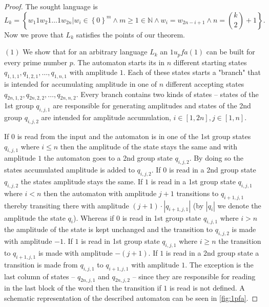 \documentclass{llncs}
\begin{document}
\begin{proof} The sought language is
\[
L_k = \left\{ w_1 1 w_2 1 \ldots 1 w_{2n} |
		w_i \in \left\{ 0 \right\}^m \wedge
		m \geq 1 \in \mathbb{N} \wedge
		w_i = w_{2n-i+1} \wedge
		n={k\choose 2}+1 \right\}.
\]
Now we prove that $L_k$ satisfies the points of our theorem.

$(1)$ We show that for an arbitrary language $L_k$ an $1u_pfa(1)$ can be built for every prime number $p$. The automaton starts its in $n$ different starting states $q_{1,1,1},q_{1,2,1},\ldots,q_{1,n,1}$ with amplitude $1$. Each of these states starts a "branch" that is intended for accumulating amplitude in one of $n$ different accepting states $q_{2n,1,2},q_{2n,2,2},\ldots,q_{2n,n,2}$. Every branch contains two kinds of states -- states of the 1st group $q_{i,j,1}$ are responsible for generating amplitudes and states of the 2nd group $q_{i,j,2}$ are intended for amplitude accumulation, $i \in \left[1, 2n \right], j \in \left[1, n \right]$.

If $0$ is read from the input and the automaton is in one of the 1st group states $q_{i,j,1}$ where $i \leq n$ then the amplitude of the state stays the same and with amplitude $1$ the automaton goes to a 2nd group state $q_{i,j,2}$. By doing so the states accumulated amplitude is added to $q_{i,j,2}$. If $0$ is read in a 2nd group state $q_{i,j,2}$ the states amplitude stays the same. If $1$ is read in a 1st group state $q_{i,j,1}$ where $i < n$ then the automaton with amplitude $j + 1$ transitions to $q_{i + 1,j,1}$ thereby transiting there with amplitude $(j + 1) \cdot \left| q_{i + 1,j,1} \right|$ (by $|q_i|$ we denote the amplitude the state $q_i$).
Whereas if $0$ is read in 1st group state $q_{i,j,1}$ where $i > n$ the amplitude of the state is kept unchanged and the transition to $q_{i,j,2}$ is made with amplitude $-1$. If $1$ is read in 1st group state $q_{i,j,1}$ where $i \geq n$ the transition to $q_{i + 1,j,1}$ is made with amplitude $-(j + 1)$. If $1$ is read in a 2nd group state a transition is made from $q_{i,j,1}$ to $q_{i + 1,j,1}$ with amplitude $1$. The exception is the last column of states -- $q_{2n,j,1}$ and $q_{2n,j,2}$ -- since they are responsible for reading in the last block of the word then the transition if $1$ is read is not defined. A schematic representation of the described automaton can be seen in \ref{fig:1pfa}.


\end{proof}
\end{document}
